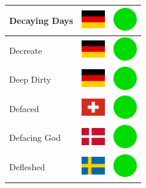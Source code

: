\documentclass[12pt, a4paper, twoside]{report}
\begin{document}
\begin{center}
\begin{longtable}{|p{5cm}|p{2cm}|p{2cm}|}
 Decaying Days                                              & \includegraphics[width=1cm]{4x3/de} &   \includegraphics[width=1cm]{likes/y} \\ \hline
 Decreate                                                   & \includegraphics[width=1cm]{4x3/de} &   \includegraphics[width=1cm]{likes/y} \\ \hline
 Deep Dirty                                                 & \includegraphics[width=1cm]{4x3/de} &   \includegraphics[width=1cm]{likes/y} \\ \hline
 Defaced                                                    & \includegraphics[width=1cm]{4x3/ch} &   \includegraphics[width=1cm]{likes/y} \\ \hline
 Defacing God                                               & \includegraphics[width=1cm]{4x3/dk} &   \includegraphics[width=1cm]{likes/y} \\ \hline
 Defleshed                                                  & \includegraphics[width=1cm]{4x3/se} &   \includegraphics[width=1cm]{likes/y} \\ \hline

\end{longtable}
\end{center}
\end{document}
